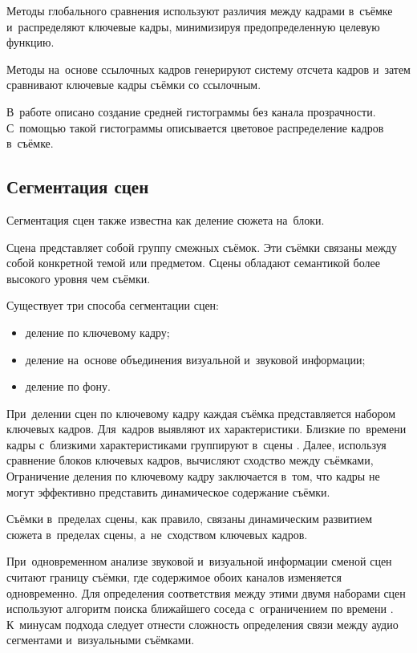 Методы глобального сравнения используют различия между кадрами
в~съёмке и~распределяют ключевые кадры,
минимизируя предопределенную целевую функцию.

Методы на~основе ссылочных кадров генерируют систему отсчета кадров
и~затем сравнивают ключевые кадры съёмки со ссылочным.

В~работе \cite{Kazunori:2006} описано создание средней
гистограммы без канала прозрачности.
С~помощью такой гистограммы описывается цветовое распределение кадров в~съёмке.


\subsection{Сегментация сцен}

Сегментация сцен также известна как деление сюжета на~блоки.

Сцена представляет собой группу смежных съёмок.
Эти съёмки связаны между собой конкретной темой или предметом.
Сцены обладают семантикой более высокого уровня чем съёмки.

Существует три способа сегментации сцен:
\begin{itemize}
    \item деление по ключевому кадру;
    \item деление на~основе объединения визуальной и~звуковой информации;
    \item деление по фону.
\end{itemize}

При~делении сцен по ключевому кадру каждая съёмка представляется набором
ключевых кадров. Для~кадров выявляют их характеристики.
Близкие по~времени кадры с~близкими
характеристиками группируют в~сцены \cite{Truong:2003}.
Далее, используя сравнение блоков ключевых кадров,
вычисляют сходство между съёмками,
Ограничение деления по ключевому кадру заключается в~том, что кадры
не могут эффективно представить динамическое содержание съёмки.

Съёмки в~пределах сцены, как правило,
связаны динамическим развитием сюжета в~пределах сцены,
а~не~сходством ключевых кадров.


При~одновременном анализе звуковой и~визуальной информации сменой сцен считают
границу съёмки, где содержимое обоих каналов изменяется одновременно.
Для определения соответствия между этими двумя наборами сцен
используют алгоритм поиска ближайшего соседа
с~ограничением по времени \cite{Sundaram:2000}.
К~минусам подхода следует отнести сложность
определения связи между аудио сегментами и~визуальными съёмками.


